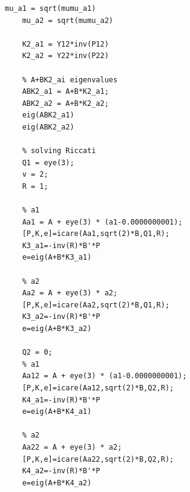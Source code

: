 \documentclass[a4paper, 12pt]{article}
\begin{document}
\begin{lstlisting}[label=task1code, caption={Программа для задания 1}]
    mu_a1 = sqrt(mumu_a1)
    mu_a2 = sqrt(mumu_a2)

    K2_a1 = Y12*inv(P12)
    K2_a2 = Y22*inv(P22)

    % A+BK2_ai eigenvalues
    ABK2_a1 = A+B*K2_a1;
    ABK2_a2 = A+B*K2_a2;
    eig(ABK2_a1)
    eig(ABK2_a2)

    % solving Riccati
    Q1 = eye(3);
    v = 2;
    R = 1;

    % a1
    Aa1 = A + eye(3) * (a1-0.0000000001);
    [P,K,e]=icare(Aa1,sqrt(2)*B,Q1,R);
    K3_a1=-inv(R)*B'*P
    e=eig(A+B*K3_a1)

    % a2
    Aa2 = A + eye(3) * a2;
    [P,K,e]=icare(Aa2,sqrt(2)*B,Q1,R);
    K3_a2=-inv(R)*B'*P
    e=eig(A+B*K3_a2)

    Q2 = 0;
    % a1
    Aa12 = A + eye(3) * (a1-0.0000000001);
    [P,K,e]=icare(Aa12,sqrt(2)*B,Q2,R);
    K4_a1=-inv(R)*B'*P
    e=eig(A+B*K4_a1)

    % a2
    Aa22 = A + eye(3) * a2;
    [P,K,e]=icare(Aa22,sqrt(2)*B,Q2,R);
    K4_a2=-inv(R)*B'*P
    e=eig(A+B*K4_a2)
    \end{lstlisting}
\end{document}

